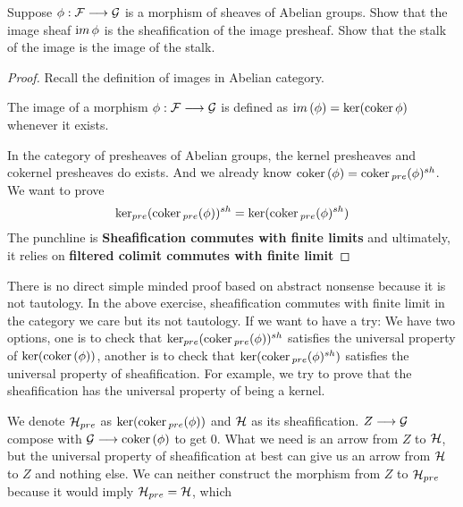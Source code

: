 \documentclass[11pt]{book} %
\begin{document}
\begin{exr}
Suppose $\phi:{\cal F}\longrightarrow {\cal G}$ is a morphism of sheaves of Abelian groups. Show that the image sheaf ${\text im\thinspace} \phi$ is the sheafification of the image presheaf. Show that the stalk of the image is the image of the stalk.
\end{exr}
\begin{proof}
Recall the definition of images in Abelian category.

The image of a morphism $\phi : {\cal F} \longrightarrow {\cal G}$ is defined as ${\text im\thinspace}(\phi) = \ker(\text{coker\,} \phi)$ whenever it exists.

In the category of presheaves of Abelian groups, the kernel presheaves and cokernel presheaves do exists. And we already know $\text{coker\,}(\phi)=\text{coker\,}_{pre}(\phi)^{sh}$. We want to prove
$$
\ker_{pre}(\text{coker\,}_{pre}(\phi))^{sh}=\ker(\text{coker\,}_{pre}(\phi)^{sh})
$$
The punchline is \textbf{Sheafification commutes with finite limits} and ultimately, it relies on \textbf{filtered colimit commutes with finite limit}

\end{proof}
\begin{remark}
There is no direct simple minded proof based on abstract nonsense because it is not tautology. In the above exercise, sheafification commutes with finite limit in the category we care but its not tautology. If we want to have a try: We have two options, one is to check that $\ker_{pre}(\text{coker\,}_{pre}(\phi))^{sh}$ satisfies the universal property of $\ker(\text{coker\,}(\phi))$, another is to check that $\ker(\text{coker\,}_{pre}(\phi)^{sh})$ satisfies the universal property of sheafification. For example, we try to prove that the sheafification has the universal property of being a kernel.
\begin{center}
\end{center}
We denote ${\cal H}_{pre}$ as $\ker(\text{coker\,}_{pre}(\phi))$ and ${\cal H}$ as its sheafification.
$Z\longrightarrow {\cal G}$ compose with ${\cal G}\longrightarrow \text{coker\,}(\phi)$ to get $0$.
What we need is an arrow from $Z$ to ${\cal H}$, but the universal property of sheafification at best can give us an arrow from ${\cal H}$ to $Z$ and nothing else. We can neither construct the morphism from $Z$ to ${\cal H}_{pre}$ because it would imply ${\cal H}_{pre}={\cal H}$, which 
\end{remark}
\end{document}
